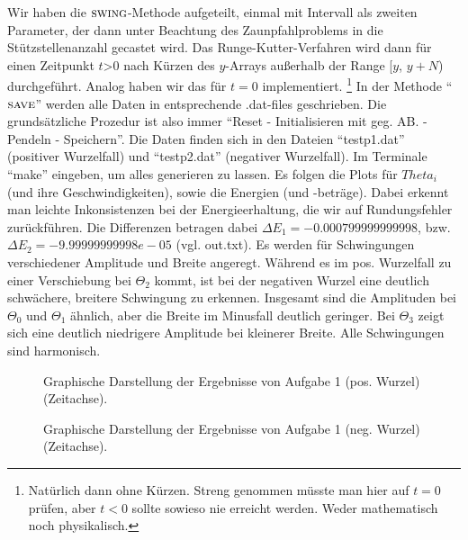 Wir haben die $\textsc{swing}$-Methode aufgeteilt, einmal mit Intervall als zweiten Parameter, der dann unter Beachtung des Zaunpfahlproblems in die Stützstellenanzahl gecastet wird. Das Runge-Kutter-Verfahren wird dann für einen Zeitpunkt $t$>0 nach Kürzen des $y$-Arrays außerhalb der Range [$y$, $y+N$) durchgeführt. Analog haben wir das für $t=0$ implementiert. \footnote{Natürlich dann ohne Kürzen. Streng genommen müsste man hier auf $t=0$ prüfen, aber $t<0$ sollte sowieso nie erreicht werden. Weder mathematisch noch physikalisch.}
In der Methode \enquote{$\textsc{save}$} werden alle Daten in entsprechende .dat-files geschrieben. Die grundsätzliche Prozedur ist also immer \enquote{Reset - Initialisieren mit geg. AB. - Pendeln - Speichern}. Die Daten finden sich in den Dateien \enquote{testp1.dat} (positiver Wurzelfall) und \enquote{testp2.dat} (negativer Wurzelfall). Im Terminale \enquote{make} eingeben, um alles generieren zu lassen.
Es folgen die Plots für $Theta_i$ (und ihre Geschwindigkeiten), sowie die Energien (und -beträge). Dabei erkennt man leichte Inkonsistenzen bei der Energieerhaltung, die wir auf Rundungsfehler zurückführen. Die Differenzen betragen dabei $\Delta E_1 = -0.000799999999998$, bzw. $\Delta E_2 = -9.99999999998e-05$ (vgl. out.txt). Es werden  für Schwingungen verschiedener Amplitude und Breite angeregt. Während es im pos. Wurzelfall zu einer Verschiebung bei $\Theta_2$ kommt, ist bei der negativen Wurzel eine deutlich schwächere, breitere Schwingung zu erkennen. Insgesamt sind die Amplituden bei $\Theta_0$ und $\Theta_1$ ähnlich, aber die Breite im Minusfall deutlich geringer. Bei $\Theta_3$ zeigt sich eine deutlich niedrigere Amplitude bei kleinerer Breite. Alle Schwingungen sind harmonisch.
\begin{landscape}
	\begin{figure}
		\caption{Graphische Darstellung der Ergebnisse von Aufgabe 1 (pos. Wurzel) (Zeitachse).}
		\label{fig:OsziA11}
	\end{figure}
\end{landscape} 

\begin{landscape}
	\begin{figure}
		\caption{Graphische Darstellung der Ergebnisse von Aufgabe 1 (neg. Wurzel) (Zeitachse).}
		\label{fig:OsziA12}
	\end{figure}
\end{landscape} 

